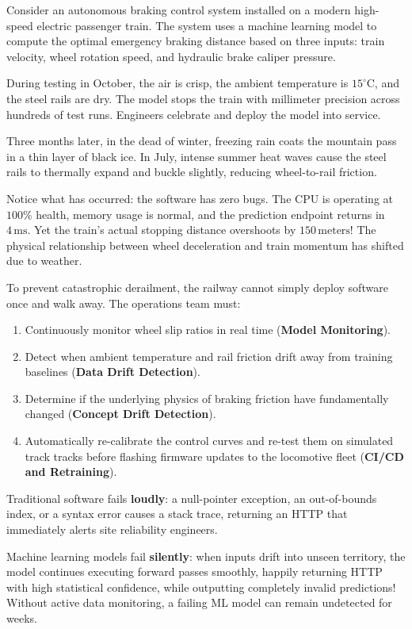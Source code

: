 \begin{analogy}
Consider an autonomous braking control system installed on a modern high-speed electric passenger train. The system uses a machine learning model to compute the optimal emergency braking distance based on three inputs: train velocity, wheel rotation speed, and hydraulic brake caliper pressure.

During testing in October, the air is crisp, the ambient temperature is $15^\circ\text{C}$, and the steel rails are dry. The model stops the train with millimeter precision across hundreds of test runs. Engineers celebrate and deploy the model into service.

Three months later, in the dead of winter, freezing rain coats the mountain pass in a thin layer of black ice. In July, intense summer heat waves cause the steel rails to thermally expand and buckle slightly, reducing wheel-to-rail friction. 

Notice what has occurred: the software has zero bugs. The CPU is operating at $100\%$ health, memory usage is normal, and the prediction endpoint returns in $4\,\text{ms}$. Yet the train's actual stopping distance overshoots by $150\,\text{meters}$! The physical relationship between wheel deceleration and train momentum has shifted due to weather.

To prevent catastrophic derailment, the railway cannot simply deploy software once and walk away. The operations team must:
\begin{enumerate}
    \item Continuously monitor wheel slip ratios in real time (\textbf{Model Monitoring}).
    \item Detect when ambient temperature and rail friction drift away from training baselines (\textbf{Data Drift Detection}).
    \item Determine if the underlying physics of braking friction have fundamentally changed (\textbf{Concept Drift Detection}).
    \item Automatically re-calibrate the control curves and re-test them on simulated track tracks before flashing firmware updates to the locomotive fleet (\textbf{CI/CD and Retraining}).
\end{enumerate}
\end{analogy}

\begin{keyidea}
Traditional software fails \textbf{loudly}: a null-pointer exception, an out-of-bounds index, or a syntax error causes a stack trace, returning an HTTP  that immediately alerts site reliability engineers.

Machine learning models fail \textbf{silently}: when inputs drift into unseen territory, the model continues executing forward passes smoothly, happily returning HTTP  with high statistical confidence, while outputting completely invalid predictions! Without active data monitoring, a failing ML model can remain undetected for weeks.
\end{keyidea}


